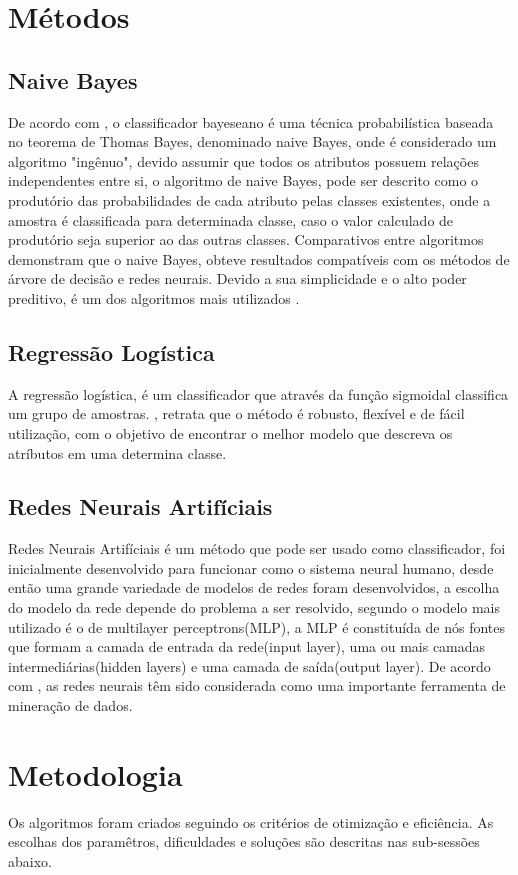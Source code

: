 \documentclass[10pt, conference, compsocconf]{IEEEtran}
\begin{document}
\section{Métodos}\label{metodos}
\subsection{Naive Bayes}
De acordo com \cite{4}, o classificador bayeseano é uma técnica probabilística baseada no teorema de Thomas Bayes, denominado naive Bayes, onde é considerado um algoritmo "ingênuo", devido assumir que todos os atributos possuem relações independentes entre si, o algoritmo de naive Bayes, pode ser descrito como o produtório das probabilidades de cada atributo pelas classes existentes, onde a amostra é classificada para determinada classe, caso o valor calculado de produtório seja superior ao das outras classes. Comparativos entre algoritmos demonstram que o naive Bayes, obteve resultados compatíveis com os métodos de árvore de decisão e redes neurais. Devido a sua simplicidade e o alto poder preditivo, é um dos algoritmos mais utilizados \cite{5}.
 
\subsection{Regressão Logística}
A regressão logística, é um classificador que através da função sigmoidal classifica um grupo de amostras. \cite{6}, retrata que o método é robusto, flexível e de fácil utilização, com o objetivo de encontrar o melhor modelo que descreva os atríbutos em uma determina classe.

\subsection{Redes Neurais Artifíciais}
Redes Neurais Artifíciais é um método que pode ser usado como classificador, foi inicialmente desenvolvido para funcionar como o sistema neural humano, desde então uma grande variedade de modelos de redes foram desenvolvidos, a escolha do modelo da rede depende do problema a ser resolvido, segundo \cite{7} o modelo mais utilizado é o de multilayer perceptrons(MLP), a MLP é constituída de nós fontes que formam a camada de entrada da rede(input layer), uma ou mais camadas intermediárias(hidden layers) e uma camada de saída(output layer). De acordo com \cite{11}, as redes neurais têm sido considerada como uma importante ferramenta de mineração de dados. 

\section{Metodologia}\label{metodologia}
Os algoritmos foram criados seguindo os critérios de otimização e eficiência. As escolhas dos paramêtros, dificuldades e soluções são descritas nas sub-sessões abaixo.
\end{document}
